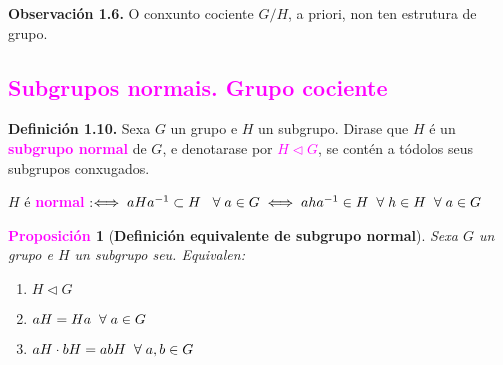 \documentclass[twoside]{report}
\newcommand{\magbf}[1]{\textcolor{magenta}{\textbf{#1}}} %
\theoremstyle{mystyle}
\newtheorem{prop}{\magbf{Proposición}}[chapter]
\newenvironment{proposition}
{\begin{mdframed}[linecolor = magenta,backgroundcolor = classicrose, linewidth = 2mm]\begin{prop}}
{\end{prop}\end{mdframed}}
\begin{document}
\hspace{3mm}

\noindent \textbf{Observación 1.6.} O conxunto cociente $G/H$, a priori, non ten estrutura de grupo.

\textcolor{magenta}{\subsection{Subgrupos normais. Grupo cociente}}

\vspace{3mm}

\noindent \textbf{Definición 1.10.} Sexa $G$ un grupo e $H$ un subgrupo. Dirase que $H$ é un \textcolor{magenta}{\textbf{subgrupo normal}} de $G$, e denotarase por \textcolor{magenta}{$H \triangleleft G$}, se contén a tódolos seus subgrupos conxugados.

\hspace{2MM}

\begin{center}
    $H$ é \textcolor{magenta}{\textbf{normal}} \hspace{1MM} :$\Longleftrightarrow \hspace{1Mm} aHa^{-1} \subset H \hspace{3MM} \forall \hspace{1mm} a \in G \hspace{1mm} \Longleftrightarrow \hspace{1mm} aha^{-1} \in H \hspace{2MM} \forall \hspace{1Mm} h \in H \hspace{2MM} \forall \hspace{1mm} a \in G$
\end{center}

\hspace{2mm}

\begin{proposition}[\textbf{Definición equivalente de subgrupo normal}] \label{prop1.4}
Sexa $G$ un grupo e $H$ un subgrupo seu. Equivalen:
\begin{enumerate}
    \item $H \triangleleft G$
    \item $aH = Ha \hspace{2mm} \forall \hspace{1mm} a \in G$
    \item $aH \cdot bH = abH \hspace{2MM} \forall \hspace{1MM} a,b \in G$
\end{enumerate}
\end{proposition}
\end{document}
